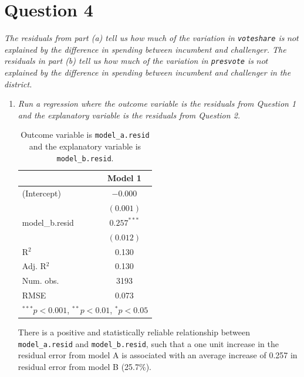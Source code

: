 \documentclass[12pt,letterpaper]{article}
\begin{document}
	\section*{Question 4}%
	\noindent \emph{The residuals from part (a) tell us how much of the variation in \texttt{voteshare} is $not$ explained by the difference in spending between incumbent and challenger. The residuals in part (b) tell us how much of the variation in \texttt{presvote} is $not$ explained by the difference in spending between incumbent and challenger in the district.}
	\begin{enumerate}
		\item \emph{Run a regression where the outcome variable is the residuals from Question 1 and the explanatory variable is the residuals from Question 2.}	\vspace{.25cm}
		
				
	
	\begin{table}[h!]
		\begin{center}
			\caption{\footnotesize{Outcome variable is \texttt{model\_a.resid} and the explanatory variable is \texttt{model\_b.resid}.}} %
			\begin{tabular}{l c }
				\hline
				& Model 1 \\
				\hline		
			(Intercept)    & $-0.000$      \\
			& $(0.001)$     \\
			model\_b.resid & $0.257^{***}$ \\
			& $(0.012)$     \\
			\hline
			R$^2$          & 0.130         \\
			Adj. R$^2$     & 0.130         \\
			Num. obs.      & 3193          \\
			RMSE           & 0.073         \\
				\hline
				\multicolumn{2}{l}{\scriptsize{$^{***}p<0.001$, $^{**}p<0.01$, $^*p<0.05$}}
			\end{tabular}
			
		\end{center}
	\end{table}


\noindent There is a positive and statistically reliable relationship between \texttt{model\_a.resid} and \texttt{model\_b.resid}, such that a one unit increase in the residual error from model A is associated with an average increase of 0.257 in residual error from model B (25.7\%).
	\newpage	


\end{enumerate}
\end{document}
